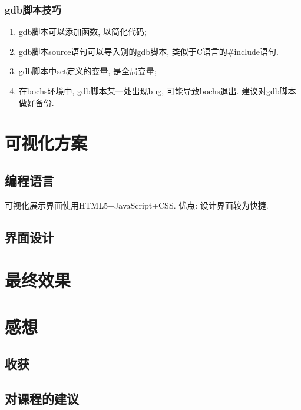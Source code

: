 \documentclass{ctexart}
\begin{document}
\subsubsection{gdb脚本技巧}
\begin{enumerate}
	\item gdb脚本可以添加函数, 以简化代码;
	\item gdb脚本source语句可以导入别的gdb脚本, 类似于C语言的\#include语句.
	\item gdb脚本中set定义的变量, 是全局变量;
	\item 在bochs环境中, gdb脚本某一处出现bug, 可能导致bochs退出. 建议对gdb脚本做好备份.
\end{enumerate}

\section{可视化方案}
\subsection{编程语言}
可视化展示界面使用HTML5+JavaScript+CSS. 优点: 设计界面较为快捷.
\subsection{界面设计}
\section{最终效果}
\section{感想}
\subsection{收获}
\subsection{对课程的建议}
\end{document}
